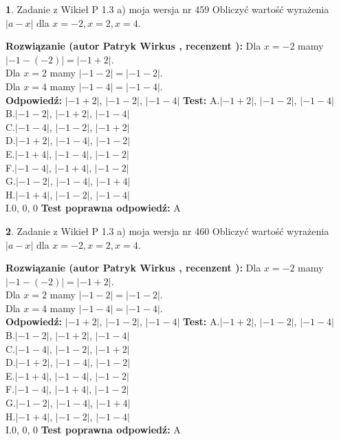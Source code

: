 \documentclass[12pt, a4paper]{article}
\theoremstyle{definition} %
\newtheorem{zad}{}
\newcommand{\zadStart}[1]{\begin{zad}#1\newline}
\newcommand{\zadStop}{\end{zad}}
\newcommand{\rozwStart}[2]{\noindent \textbf{Rozwiązanie (autor #1 , recenzent #2): }\newline}
\newcommand{\rozwStop}{\newline}
\newcommand{\odpStart}{\noindent \textbf{Odpowiedź:}\newline}
\newcommand{\odpStop}{\newline}
\newcommand{\testStart}{\noindent \textbf{Test:}\newline}
\newcommand{\testStop}{\newline}
\newcommand{\kluczStart}{\noindent \textbf{Test poprawna odpowiedź:}\newline}
\newcommand{\kluczStop}{\newline}
\begin{document}
\zadStart{Zadanie z Wikieł P 1.3 a) moja wersja nr 459}
Obliczyć wartość wyrażenia $|a - x|$ dla $x=-2,x=2,x=4$.
\zadStop
\rozwStart{Patryk Wirkus}{}
Dla $x = -2$ mamy $|-1 - (-2)| = |-1 + 2|$.\\
Dla $x = 2$ mamy $|-1 - 2| = |-1 - 2|$.\\
Dla $x = 4$ mamy $|-1 - 4| = |-1 - 4|$.\\
\rozwStop
\odpStart
$|-1 + 2|$, $|-1 - 2|$, $|-1 - 4|$
\odpStop
\testStart
A.$|-1 + 2|$, $|-1 - 2|$, $|-1 - 4|$\\
B.$|-1 - 2|$, $|-1 + 2|$, $|-1 - 4|$\\
C.$|-1 - 4|$, $|-1 - 2|$, $|-1 + 2|$\\
D.$|-1 + 2|$, $|-1 - 4|$, $|-1 - 2|$\\
E.$|-1 + 4|$, $|-1 - 4|$, $|-1 - 2|$\\
F.$|-1 - 4|$, $|-1 + 4|$, $|-1 - 2|$\\
G.$|-1 - 2|$, $|-1 - 4|$, $|-1 + 4|$\\
H.$|-1 + 4|$, $|-1 - 2|$, $|-1 - 4|$\\
I.$0$, $0$, $0$
\testStop
\kluczStart
A
\kluczStop



\zadStart{Zadanie z Wikieł P 1.3 a) moja wersja nr 460}
Obliczyć wartość wyrażenia $|a - x|$ dla $x=-2,x=2,x=4$.
\zadStop
\rozwStart{Patryk Wirkus}{}
Dla $x = -2$ mamy $|-1 - (-2)| = |-1 + 2|$.\\
Dla $x = 2$ mamy $|-1 - 2| = |-1 - 2|$.\\
Dla $x = 4$ mamy $|-1 - 4| = |-1 - 4|$.\\
\rozwStop
\odpStart
$|-1 + 2|$, $|-1 - 2|$, $|-1 - 4|$
\odpStop
\testStart
A.$|-1 + 2|$, $|-1 - 2|$, $|-1 - 4|$\\
B.$|-1 - 2|$, $|-1 + 2|$, $|-1 - 4|$\\
C.$|-1 - 4|$, $|-1 - 2|$, $|-1 + 2|$\\
D.$|-1 + 2|$, $|-1 - 4|$, $|-1 - 2|$\\
E.$|-1 + 4|$, $|-1 - 4|$, $|-1 - 2|$\\
F.$|-1 - 4|$, $|-1 + 4|$, $|-1 - 2|$\\
G.$|-1 - 2|$, $|-1 - 4|$, $|-1 + 4|$\\
H.$|-1 + 4|$, $|-1 - 2|$, $|-1 - 4|$\\
I.$0$, $0$, $0$
\testStop
\kluczStart
A
\kluczStop
\end{document}
